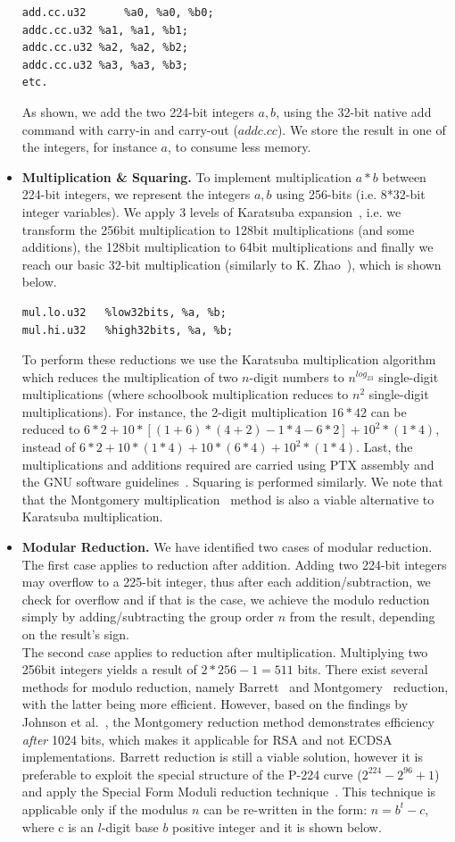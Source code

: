 \documentclass[11pt,twocolumn]{IEEEtran}
\begin{document}
\begin{itemize}
\begin{verbatim}
add.cc.u32		%a0, %a0, %b0;
addc.cc.u32	%a1, %a1, %b1;
addc.cc.u32	%a2, %a2, %b2;
addc.cc.u32	%a3, %a3, %b3;	
etc.
\end{verbatim}
\normalsize
As shown, we add the two 224-bit integers $a,b$, using  the 32-bit native add command with carry-in and carry-out ($addc.cc$). We store the result in one of the integers, for instance $a$, to consume less memory. 
\item \textbf{Multiplication \& Squaring.} To implement multiplication $a*b$ between 224-bit integers, we represent the integers $a,b$ using 256-bits (i.e. 8*32-bit integer variables). We apply 3 levels of Karatsuba expansion~\cite{karatsuba}, i.e. we transform the 256bit multiplication to 128bit multiplications (and some additions), the 128bit multiplication to 64bit multiplications and finally we reach our basic 32-bit multiplication (similarly to K. Zhao~\cite{zhao}), which is shown below.\\
\small
\begin{verbatim}
mul.lo.u32	 %low32bits, %a, %b;
mul.hi.u32	 %high32bits, %a, %b;
\end{verbatim}
\normalsize
To perform these reductions we use the Karatsuba multiplication algorithm which reduces the multiplication of two $n$-digit numbers to $n^{log_23}$ single-digit multiplications (where schoolbook multiplication reduces to $n^2$ single-digit multiplications). For instance, the 2-digit multiplication $16*42$ can be reduced to $6*2+10*[(1+6)*(4+2)-1*4-6*2]+10^2*(1*4)$, instead of $6*2 + 10*(1*4) + 10*(6*4) + 10^2*(1*4)$. Last, the multiplications and additions required are carried using PTX assembly and the GNU software guidelines~\cite{gnu}. Squaring is performed similarly. We note that that the Montgomery multiplication~\cite{montgomery} method is also a viable alternative to Karatsuba multiplication.
\item \textbf{Modular Reduction.} We have identified two cases of modular reduction. The first case applies to reduction after addition. Adding two 224-bit integers may overflow to a 225-bit integer, thus after each addition/subtraction, we check for overflow and if that is the case, we achieve the modulo reduction simply by adding/subtracting the group order $n$ from the result, depending on the result's sign.\\
The second case applies to reduction after multiplication. Multiplying two 256bit integers yields a result of $2*256-1=511$ bits. There exist several methods for modulo reduction, namely Barrett~\cite{baret} and Montgomery~\cite{montgomery} reduction, with the latter being more efficient. However, based on the findings by Johnson et al.~\cite{modcomparison}, the Montgomery reduction method demonstrates efficiency \emph{after} 1024 bits, which makes it applicable for RSA and not ECDSA implementations. Barrett reduction is still a viable solution, however it is preferable to exploit the special structure of the P-224 curve ($2^{224}-2^{96}+1$) and apply the Special Form Moduli reduction technique~\cite{hac,microsoft}. This technique is applicable only if the modulus $n$ can be re-written in the form: $n=b^t-c$, where c is an $l$-digit base $b$ positive integer and it is shown below.\\

\end{itemize}
\end{document}
